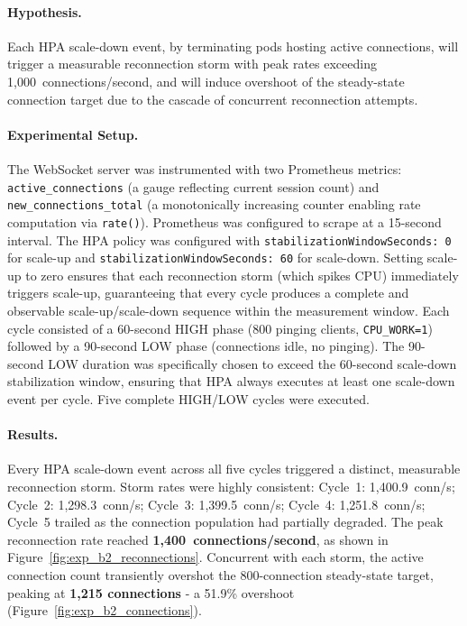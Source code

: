 \documentclass[twocolumn]{svjour3}
\begin{document}
\paragraph{Hypothesis.} Each HPA scale-down event, by terminating pods hosting active
connections, will trigger a measurable reconnection storm with peak rates exceeding
1,000~connections/second, and will induce overshoot of the steady-state connection target
due to the cascade of concurrent reconnection attempts.

\paragraph{Experimental Setup.} The WebSocket server was instrumented with two Prometheus
metrics: \texttt{active\_connections} (a gauge reflecting current session count) and
\texttt{new\_connections\_total} (a monotonically increasing counter enabling rate computation
via \texttt{rate()}). Prometheus was configured to scrape at a 15-second interval. The HPA
policy was configured with \texttt{stabilizationWindowSeconds: 0} for scale-up and
\texttt{stabilizationWindowSeconds: 60} for scale-down. Setting scale-up to zero ensures that
each reconnection storm (which spikes CPU) immediately triggers scale-up, guaranteeing that
every cycle produces a complete and observable scale-up/scale-down sequence within the
measurement window. Each cycle consisted of a 60-second HIGH phase (800 pinging clients,
\texttt{CPU\_WORK=1}) followed by a 90-second LOW phase (connections idle, no pinging). The
90-second LOW duration was specifically chosen to exceed the 60-second scale-down stabilization
window, ensuring that HPA always executes at least one scale-down event per cycle. Five
complete HIGH/LOW cycles were executed.

\paragraph{Results.} Every HPA scale-down event across all five cycles triggered a distinct,
measurable reconnection storm. Storm rates were highly consistent: Cycle~1:
1,400.9~conn/s; Cycle~2: 1,298.3~conn/s; Cycle~3: 1,399.5~conn/s; Cycle~4: 1,251.8~conn/s;
Cycle~5 trailed as the connection population had partially degraded. The peak reconnection
rate reached \textbf{1,400~connections/second}, as shown in
Figure~\ref{fig:exp_b2_reconnections}. Concurrent with each storm, the active connection
count transiently overshot the 800-connection steady-state target, peaking at \textbf{1,215
connections} - a 51.9\% overshoot (Figure~\ref{fig:exp_b2_connections}).
\end{document}
